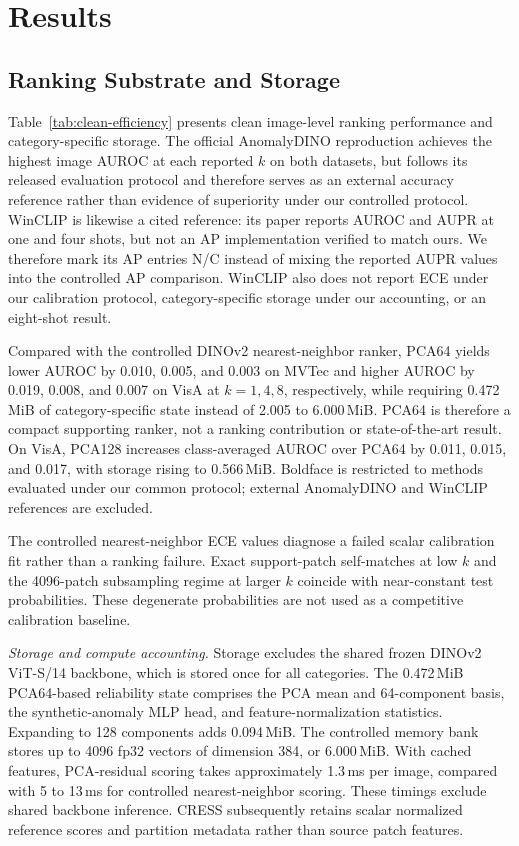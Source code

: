 \section{Results}\label{sec:results}

\subsection{Ranking Substrate and Storage}


Table~\ref{tab:clean-efficiency} presents clean image-level ranking performance and category-specific storage. The official AnomalyDINO reproduction achieves the highest image AUROC at each reported $k$ on both datasets, but follows its released evaluation protocol and therefore serves as an external accuracy reference rather than evidence of superiority under our controlled protocol. WinCLIP is likewise a cited reference: its paper reports AUROC and AUPR at one and four shots, but not an AP implementation verified to match ours. We therefore mark its AP entries N/C instead of mixing the reported AUPR values into the controlled AP comparison. WinCLIP also does not report ECE under our calibration protocol, category-specific storage under our accounting, or an eight-shot result.

Compared with the controlled DINOv2 nearest-neighbor ranker, PCA64 yields lower AUROC by 0.010, 0.005, and 0.003 on MVTec and higher AUROC by 0.019, 0.008, and 0.007 on VisA at $k=1,4,8$, respectively, while requiring 0.472\,MiB of category-specific state instead of 2.005 to 6.000\,MiB. PCA64 is therefore a compact supporting ranker, not a ranking contribution or state-of-the-art result. On VisA, PCA128 increases class-averaged AUROC over PCA64 by 0.011, 0.015, and 0.017, with storage rising to 0.566\,MiB. Boldface is restricted to methods evaluated under our common protocol; external AnomalyDINO and WinCLIP references are excluded.

The controlled nearest-neighbor ECE values diagnose a failed scalar calibration fit rather than a ranking failure. Exact support-patch self-matches at low $k$ and the 4096-patch subsampling regime at larger $k$ coincide with near-constant test probabilities. These degenerate probabilities are not used as a competitive calibration baseline.

\emph{Storage and compute accounting.} Storage excludes the shared frozen DINOv2 ViT-S/14 backbone, which is stored once for all categories. The 0.472\,MiB PCA64-based reliability state comprises the PCA mean and 64-component basis, the synthetic-anomaly MLP head, and feature-normalization statistics. Expanding to 128 components adds 0.094\,MiB. The controlled memory bank stores up to 4096 fp32 vectors of dimension 384, or 6.000\,MiB. With cached features, PCA-residual scoring takes approximately 1.3\,ms per image, compared with 5 to 13\,ms for controlled nearest-neighbor scoring. These timings exclude shared backbone inference. CRESS subsequently retains scalar normalized reference scores and partition metadata rather than source patch features.

